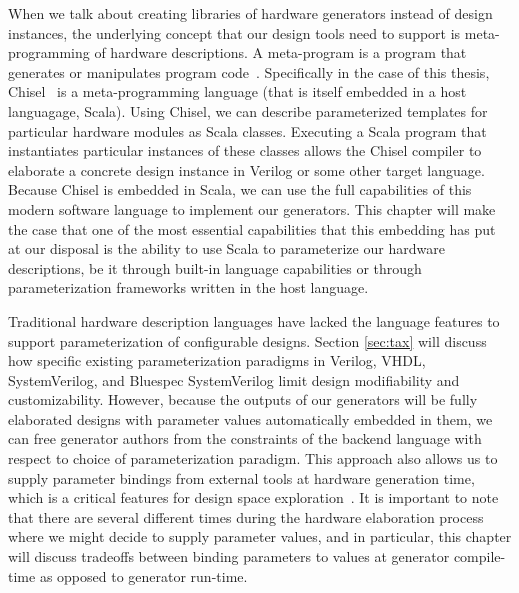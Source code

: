When we talk about creating libraries of hardware generators instead of design instances,
the underlying concept that our design tools need to support is meta-programming of hardware descriptions.
A meta-program is a program that generates or manipulates program code~\cite{templates}.
Specifically in the case of this thesis, Chisel~\cite{chisel} is a meta-programming language (that is itself embedded in a host languagage, Scala).
Using Chisel, we can describe parameterized templates for particular hardware modules as Scala classes.
Executing a Scala program that instantiates particular instances of these classes allows the Chisel compiler
to elaborate a concrete design instance in Verilog or some other target language.
Because Chisel is embedded in Scala, we can use the full capabilities of this modern software language to implement our generators.
This chapter will make the case that one of the most essential capabilities that this embedding has put at our disposal
is the ability to use Scala to parameterize our hardware descriptions,
be it through built-in language capabilities or through parameterization frameworks written in the host language.

Traditional hardware description languages have lacked the language features to support parameterization of configurable designs.
Section \ref{sec:tax} will discuss how specific existing parameterization paradigms in Verilog, VHDL, SystemVerilog, and Bluespec SystemVerilog limit design modifiability and customizability.
However, because the outputs of our generators will be fully elaborated designs with parameter values  automatically embedded in them,
we can free generator authors from the constraints of the backend language with respect to choice of parameterization paradigm.
This approach also allows us to supply parameter bindings from external tools at hardware generation time,
which is a critical features for design space exploration~\cite{shacham2011chip}.
It is important to note that there are several different times during the hardware elaboration process where
we might decide to supply parameter values, and in particular, this chapter will discuss tradeoffs between
binding parameters to values at generator compile-time as opposed to generator run-time.

